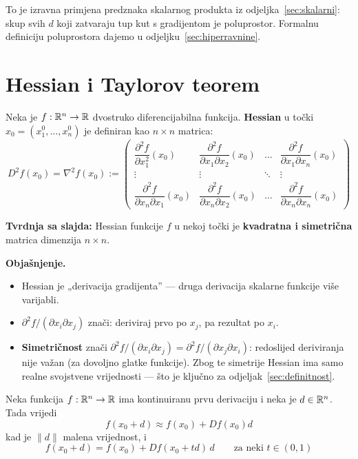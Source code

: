 To je izravna primjena predznaka skalarnog produkta iz
odjeljka~\ref{sec:skalarni}: skup svih $d$ koji zatvaraju tup kut s gradijentom
je poluprostor. Formalnu definiciju poluprostora dajemo u
odjeljku~\ref{sec:hiperravnine}.

\section{Hessian i Taylorov teorem}

\begin{definicija}[Hessian]
Neka je $f : \mathbb{R}^n \to \mathbb{R}$ dvostruko diferencijabilna funkcija. \textbf{Hessian}
u točki $x_0 = (x_1^0, \dots, x_n^0)$ je definiran kao $n \times n$ matrica:
\[
D^2f(x_0) = \nabla^2 f(x_0) :=
\begin{pmatrix}
\dfrac{\partial^2 f}{\partial x_1^2}(x_0) &
\dfrac{\partial^2 f}{\partial x_1 \partial x_2}(x_0) & \dots &
\dfrac{\partial^2 f}{\partial x_1 \partial x_n}(x_0) \\[10pt]
\vdots & \vdots & \ddots & \vdots \\[6pt]
\dfrac{\partial^2 f}{\partial x_n \partial x_1}(x_0) &
\dfrac{\partial^2 f}{\partial x_n \partial x_2}(x_0) & \dots &
\dfrac{\partial^2 f}{\partial x_n \partial x_n}(x_0)
\end{pmatrix}
\]
\end{definicija}

\textbf{Tvrdnja sa slajda:} Hessian funkcije $f$ u nekoj točki je
\textbf{kvadratna i simetrična} matrica dimenzija $n \times n$.

\textbf{Objašnjenje.}
\begin{itemize}
  \item Hessian je „derivacija gradijenta” --- druga derivacija skalarne
        funkcije više varijabli.
  \item $\partial^2 f/(\partial x_i \partial x_j)$ znači: deriviraj prvo po
        $x_j$, pa rezultat po $x_i$.
  \item \textbf{Simetričnost} znači $\partial^2 f/(\partial x_i\partial x_j)
        = \partial^2 f/(\partial x_j\partial x_i)$: redoslijed deriviranja nije
        važan (za dovoljno glatke funkcije). Zbog te simetrije Hessian ima samo
        realne svojstvene vrijednosti --- što je ključno za
        odjeljak~\ref{sec:definitnost}.
\end{itemize}

\begin{teorem}
Neka funkcija $f : \mathbb{R}^n \to \mathbb{R}$ ima kontinuiranu prvu derivaciju i neka je
$d \in \mathbb{R}^n$. Tada vrijedi
\[
f(x_0 + d) \approx f(x_0) + Df(x_0)d
\]
kad je $\|d\|$ malena vrijednost, i
\[
f(x_0 + d) = f(x_0) + Df(x_0 + td)\,d \qquad \text{za neki } t \in (0,1)
\]
\end{teorem}

